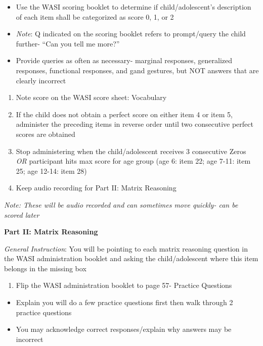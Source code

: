 \documentclass[]{book}
\providecommand{\tightlist}{%
  \setlength{\itemsep}{0pt}\setlength{\parskip}{0pt}}
\begin{document}
\begin{itemize}
\tightlist
\item
  Use the WASI scoring booklet to determine if child/adolescent's
  description of each item shall be categorized as score 0, 1, or 2
\item
  \emph{Note}: Q indicated on the scoring booklet refers to prompt/query
  the child further- ``Can you tell me more?''
\item
  Provide queries as often as necessary- marginal responses, generalized
  responses, functional responses, and gand gestures, but NOT answers
  that are clearly incorrect
\end{itemize}

\begin{enumerate}
\def\labelenumi{\arabic{enumi}.}
\setcounter{enumi}{3}
\tightlist
\item
  Note score on the WASI score sheet: Vocabulary
\item
  If the child does not obtain a perfect score on either item 4 or item
  5, administer the preceding items in reverse order until two
  consecutive perfect scores are obtained
\item
  Stop administering when the child/adolescent receives 3 consecutive
  Zeros \emph{OR} participant hits max score for age group (age 6: item
  22; age 7-11: item 25; age 12-14: item 28)
\item
  Keep audio recording for Part II: Matrix Reasoning
\end{enumerate}

\emph{Note: These will be audio recorded and can sometimes move quickly-
can be scored later}

\textbf{Part II: Matrix Reasoning}

\emph{General Instruction}: You will be pointing to each matrix
reasoning question in the WASI administration booklet and asking the
child/adolescent where this item belongs in the missing box

\begin{enumerate}
\def\labelenumi{\arabic{enumi}.}
\tightlist
\item
  Flip the WASI administration booklet to page 57- Practice Questions
\end{enumerate}

\begin{itemize}
\tightlist
\item
  Explain you will do a few practice questions first then walk through 2
  practice questions
\item
  You may acknowledge correct responses/explain why answers may be
  incorrect
\end{itemize}
\end{document}

